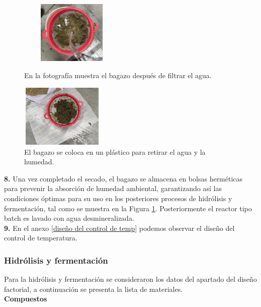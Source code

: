 \documentclass[12pt]{article}
\begin{document}
	
		\begin{figure}[H]
		\centering
		\begin{minipage}{0.46\textwidth}
			\centering
			\includegraphics[width=5cm, height=3cm]{imagenes/enjuagado} %
			\caption{En la fotografía muestra el bagazo después de filtrar el agua.}
			\label{enjuagado}
		\end{minipage}
		\hfill
		\begin{minipage}{0.48\textwidth}
			\centering
			\includegraphics[width=4cm, height=3cm]{imagenes/secado6} %
			\caption{El bagazo se coloca en un plástico para retirar el agua y la humedad.}
			\label{biologico4}
		\end{minipage}
	\end{figure}
	
	
	
	
	
	 \textbf{8.} Una vez completado el secado, el bagazo se almacena en bolsas herméticas para prevenir la absorción de humedad ambiental, garantizando así las condiciones óptimas para su uso en los posteriores procesos de hidrólisis y fermentación, tal como se muestra en la Figura \ref{biologico4}. Posteriormente el reactor tipo batch es lavado con agua desmineralizada. \\[0.5em]
	
	\textbf{9.} En el anexo \ref{diseño del control de temp} podemos observar el diseño del control de temperatura.
	

			
				\subsubsection{Hidrólisis y fermentación}
				
			Para la hidrólisis y fermentación se consideraron los datos del apartado del diseño factorial, a continuación se presenta la lista de materiales.
			\\
					 \textbf{Compuestos} \\[0.5em]
					 
\end{document}
